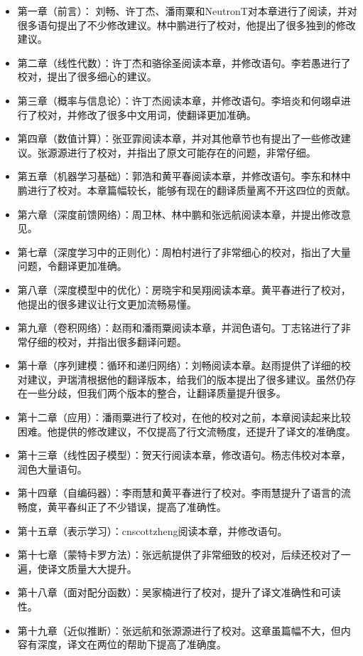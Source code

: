 \begin{itemize}
\item  第一章（前言）： 刘畅、许丁杰、潘雨粟和NeutronT对本章进行了阅读，并对很多语句提出了不少修改建议。林中鹏进行了校对，他提出了很多独到的修改建议。
\item  第二章（线性代数）：许丁杰和骆徐圣阅读本章，并修改语句。李若愚进行了校对，提出了很多细心的建议。
\item  第三章（概率与信息论）：许丁杰阅读本章，并修改语句。李培炎和何翊卓进行了校对，并修改了很多中文用词，使翻译更加准确。
\item  第四章（数值计算）：张亚霏阅读本章，并对其他章节也有提出了一些修改建议。张源源进行了校对，并指出了原文可能存在的问题，非常仔细。
\item  第五章（机器学习基础）：郭浩和黄平春阅读本章，并修改语句。李东和林中鹏进行了校对。本章篇幅较长，能够有现在的翻译质量离不开这四位的贡献。
\item  第六章（深度前馈网络）：周卫林、林中鹏和张远航阅读本章，并提出修改意见。
\item  第七章（深度学习中的正则化）：周柏村进行了非常细心的校对，指出了大量问题，令翻译更加准确。
\item  第八章（深度模型中的优化）：房晓宇和吴翔阅读本章。黄平春进行了校对，他提出的很多建议让行文更加流畅易懂。
\item  第九章（卷积网络）：赵雨和潘雨粟阅读本章，并润色语句。丁志铭进行了非常仔细的校对，并指出很多翻译问题。
\item  第十章（序列建模：循环和递归网络）：刘畅阅读本章。赵雨提供了详细的校对建议，尹瑞清根据他的翻译版本，给我们的版本提出了很多建议。虽然仍存在一些分歧，但我们两个版本的整合，让翻译质量提升很多。
\item  第十二章（应用）：潘雨粟进行了校对，在他的校对之前，本章阅读起来比较困难。他提供的修改建议，不仅提高了行文流畅度，还提升了译文的准确度。
\item  第十三章（线性因子模型）：贺天行阅读本章，修改语句。杨志伟校对本章，润色大量语句。
\item  第十四章（自编码器）：李雨慧和黄平春进行了校对。李雨慧提升了语言的流畅度，黄平春纠正了不少错误，提高了准确性。
\item  第十五章（表示学习）：cnscottzheng阅读本章，并修改语句。
\item  第十七章（蒙特卡罗方法）：张远航提供了非常细致的校对，后续还校对了一遍，使译文质量大大提升。
\item  第十八章（面对配分函数）：吴家楠进行了校对，提升了译文准确性和可读性。
\item  第十九章（近似推断）：张远航和张源源进行了校对。这章虽篇幅不大，但内容有深度，译文在两位的帮助下提高了准确度。
\end{itemize}
 

